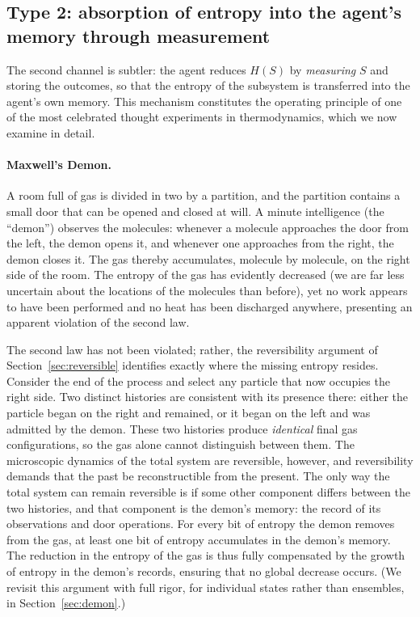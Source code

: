 \documentclass[11pt]{article}
\begin{document}
\subsection{Type 2: absorption of entropy into the agent's memory through measurement}
\label{sec:type2}

The second channel is subtler: the agent reduces $H(S)$ by \emph{measuring} $S$ and storing the outcomes, so that the entropy of the subsystem is transferred into the agent's own memory. This mechanism constitutes the operating principle of one of the most celebrated thought experiments in thermodynamics, which we now examine in detail.

\paragraph{Maxwell's Demon.} A room full of gas is divided in two by a partition, and the partition contains a small door that can be opened and closed at will. A minute intelligence (the ``demon'') observes the molecules: whenever a molecule approaches the door from the left, the demon opens it, and whenever one approaches from the right, the demon closes it. The gas thereby accumulates, molecule by molecule, on the right side of the room. The entropy of the gas has evidently decreased (we are far less uncertain about the locations of the molecules than before), yet no work appears to have been performed and no heat has been discharged anywhere, presenting an apparent violation of the second law.

The second law has not been violated; rather, the reversibility argument of Section~\ref{sec:reversible} identifies exactly where the missing entropy resides. Consider the end of the process and select any particle that now occupies the right side. Two distinct histories are consistent with its presence there: either the particle began on the right and remained, or it began on the left and was admitted by the demon. These two histories produce \emph{identical} final gas configurations, so the gas alone cannot distinguish between them. The microscopic dynamics of the total system are reversible, however, and reversibility demands that the past be reconstructible from the present. The only way the total system can remain reversible is if some other component differs between the two histories, and that component is the demon's memory: the record of its observations and door operations. For every bit of entropy the demon removes from the gas, at least one bit of entropy accumulates in the demon's memory. The reduction in the entropy of the gas is thus fully compensated by the growth of entropy in the demon's records, ensuring that no global decrease occurs. (We revisit this argument with full rigor, for individual states rather than ensembles, in Section~\ref{sec:demon}.)
\end{document}

